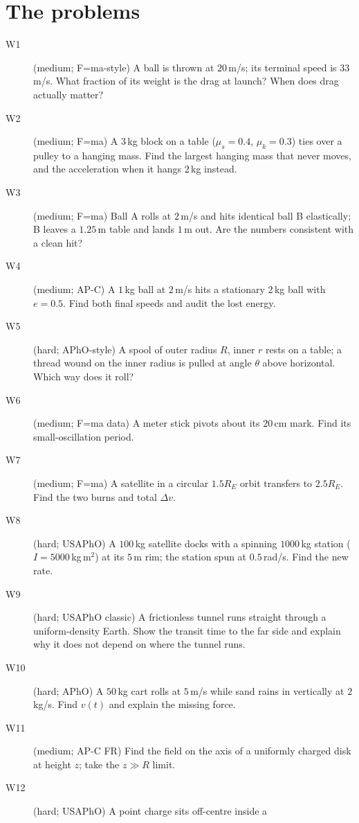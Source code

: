 \section{The problems}\label{sec:ws-problems}

\begin{description}
\item[W1] (medium; F=ma-style) A ball is thrown at $20$\,m/s; its
terminal speed is $33$\,m/s. What fraction of its weight is the drag at
launch? When does drag actually matter?
\item[W2] (medium; F=ma) A $3$\,kg block on a table ($\mu_s=0.4$,
$\mu_k=0.3$) ties over a pulley to a hanging mass. Find the largest
hanging mass that never moves, and the acceleration when it hangs
$2$\,kg instead.
\item[W3] (medium; F=ma) Ball A rolls at $2$\,m/s and hits identical
ball B elastically; B leaves a $1.25$\,m table and lands $1$\,m out.
Are the numbers consistent with a clean hit?
\item[W4] (medium; AP-C) A $1$\,kg ball at $2$\,m/s hits a stationary
$2$\,kg ball with $e=0.5$. Find both final speeds and audit the lost
energy.
\item[W5] (hard; APhO-style) A spool of outer radius $R$, inner $r$
rests on a table; a thread wound on the inner radius is pulled at
angle $\theta$ above horizontal. Which way does it roll?
\item[W6] (medium; F=ma data) A meter stick pivots about its $20$\,cm
mark. Find its small-oscillation period.
\item[W7] (medium; F=ma) A satellite in a circular $1.5R_E$ orbit
transfers to $2.5R_E$. Find the two burns and total $\Delta v$.
\item[W8] (hard; USAPhO) A $100$\,kg satellite docks with a spinning
$1000$\,kg station ($I=5000$\,kg\,m$^{2}$) at its $5$\,m rim; the
station spun at $0.5$\,rad/s. Find the new rate.
\item[W9] (hard; USAPhO classic) A frictionless tunnel runs straight
through a uniform-density Earth. Show the transit time to the far side
and explain why it does not depend on where the tunnel runs.
\item[W10] (hard; APhO) A $50$\,kg cart rolls at $5$\,m/s while sand
rains in vertically at $2$\,kg/s. Find $v(t)$ and explain the missing
force.
\item[W11] (medium; AP-C FR) Find the field on the axis of a uniformly
charged disk at height $z$; take the $z\gg R$ limit.
\item[W12] (hard; USAPhO) A point charge sits off-centre inside a

\end{description}
